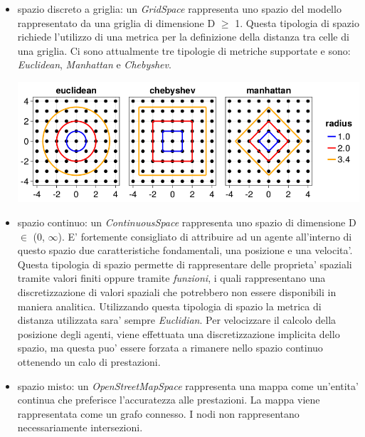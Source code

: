 \begin{itemize}
\begin{itemize}
        \item spazio discreto a griglia: un \emph{GridSpace} rappresenta uno spazio del modello
        rappresentato da una griglia di dimensione D $\geq$ 1. Questa tipologia di spazio 
        richiede l'utilizzo di una metrica per la definizione della distanza
        tra celle di una griglia. Ci sono attualmente tre tipologie di metriche supportate 
        e sono: \emph{Euclidean}, \emph{Manhattan} e \emph{Chebyshev}.

        \begin{minipage}{\linewidth}
            \centering
            \includegraphics[width=\textwidth]{img/distance.png}
            \label{fig:gridspace_distances}
        \end{minipage}
        
        \item spazio continuo: un \emph{ContinuousSpace} rappresenta uno spazio di dimensione
        D $\in$ (0, $\infty$). E' fortemente consigliato di attribuire ad un agente all'interno 
        di questo spazio due caratteristiche fondamentali, una posizione e una velocita'. Questa 
        tipologia di spazio permette di rappresentare delle proprieta' spaziali tramite valori 
        finiti oppure tramite \emph{funzioni}, i quali rappresentano una discretizzazione di 
        valori spaziali che potrebbero non essere disponibili in maniera analitica. Utilizzando questa 
        tipologia di spazio la metrica di distanza utilizzata sara' sempre \emph{Euclidian}.
        Per velocizzare il calcolo della posizione degli agenti, viene effettuata una discretizzazione
        implicita dello spazio, ma questa puo' essere forzata a rimanere nello spazio continuo 
        ottenendo un calo di prestazioni.

        \item spazio misto: un \emph{OpenStreetMapSpace} rappresenta una mappa come un'entita' 
        continua che preferisce l'accuratezza alle prestazioni. La mappa viene rappresentata 
        come un grafo connesso. I nodi non rappresentano necessariamente intersezioni. 
    \end{itemize}
\end{itemize} 


